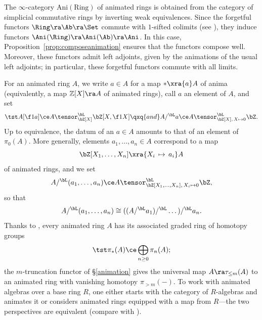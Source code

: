 \m
The $\infty$-category $\mathrm{Ani}(\mathrm{Ring})$ %
of animated rings is obtained from the category of simplicial commutative rings by inverting weak equivalences. %
\eenum
Since the forgetful functors $\Ring \ra \Ab \ra \Set$ commute with $1$-sifted colimits (see ), they induce functors $\Ani(\Ring) \ra \Ani(\Ab) \ra \Ani$. In this case, Proposition~\ref{prop:composeanimation} ensures that the functors compose well. Moreover, these functors admit left adjoints, given by the animations of the usual left adjoints; in particular, these forgetful functors commute with all limits.
\eeg





 \label{ani-rings}
For an animated ring $A$, we write $a\in A$ for a map $\ast\xra{a} A$ of anima %
(equivalently, a map $\mathbb Z[X]\ra A$ of animated rings), call $a$ an element of $A$, and set
\[
\tst A[\f 1a] \ce A \tensor^\bL_{\bZ[X]} \bZ[X, \f 1X] \qxq{and} A/^\bL a \ce A \tensor_{\bZ[X],\, X\mapsto 0}^\bL \bZ.
\]
Up to equivalence, the datum of an $a\in A$ amounts to that of an element of $\pi_0(A)$. More generally, elements $a_1, \dotsc, a_n \in A$ correspond to a map
\[
\bZ[X_1, \dotsc, X_n] \xra{X_i\, \mapsto\, a_i} A
\]
of animated rings, and we set
\[
A/^\bL (a_1, \dotsc, a_n) \ce A \tensor_{\bZ[X_1, \dotsc, X_n],\, X_i\mapsto 0}^\bL \bZ,
\]
so that
\[
A/^\bL (a_1, \dotsc, a_n) \cong ((A/^\bL a_1)/^\bL \dotsc )/^\bL a_n.
\]
Thanks to  , every animated ring $A$ has its associated graded ring of homotopy groups
\[
\tst \pi_*(A) \ce \bigoplus_{n \ge 0} \pi_n(A);
\]
the $m$-truncation functor of \S\ref{animation} gives the universal map $A \ra \tau_{\le m}(A)$ to an animated ring with vanishing homotopy $\pi_{> m}(-)$. To work with animated algebras over a base ring $R$, one either starts with the category of $R$-algebras and animates it or considers animated rings equipped with a map from $R$---the two perspectives are equivalent (compare with \cite[Corollary~25.1.4.3]{SAG}).


